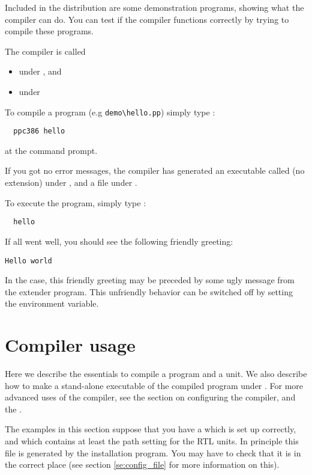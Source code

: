 \documentclass{report}
\begin{document}
Included in the \fpc distribution are some demonstration programs, 
showing what the compiler can do. 
You can test if the compiler functions correctly by trying to compile 
these programs.

The compiler is called
\begin{itemize}
\item {} under \dos, and 
\item {} under \linux
\end{itemize}
To compile a program (e.g \verb|demo\hello.pp|) simply type :
\begin{verbatim}
  ppc386 hello
\end{verbatim}
at the command prompt. 

If you got no error messages, the compiler has generated an executable 
called   (no extension) under \linux, and a file 
under \dos. 

To execute the program, simply type :
\begin{verbatim}
  hello
\end{verbatim}
If all went well, you should see the following friendly greeting:
\begin{verbatim}
Hello world
\end{verbatim}
In the \dos case, this friendly greeting may be preceded by some ugly
message from the  extender program. This unfriendly behavior can 
be switched off by setting the  environment variable.

\chapter{Compiler usage}
\label{ch:Usage}

Here we describe the essentials to compile a program and a unit. 
We also describe how to make a stand-alone executable of the 
compiled program under \dos. For more advanced uses of the compiler, 
see the section on configuring the compiler, and the 
\progref.

The examples in this section suppose that you have a  which
is set up correctly, and which contains at least the path setting for the
RTL units. In principle this file is generated by the installation program.
You may have to check that it is in the correct place (see section
\ref{se:config_file} for more information on this).
\end{document}
